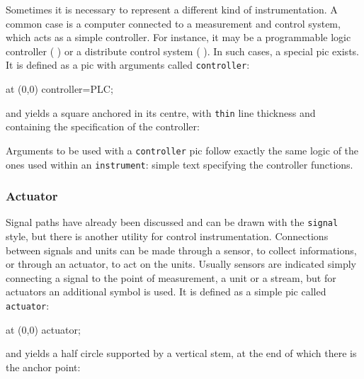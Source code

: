 \documentclass[12pt]{article}						%
\newcommand*{\ac}[1]{%
		\textsmaller{#1}%
	}
\newcommand*{\chpn}[1]{\texttt{#1}}				%
\newcommand*{\chpp}[1]{\texttt{#1}}				%
\newcommand*{\chps}[1]{\texttt{#1}}				%
\begin{document}
Sometimes it is necessary to represent a different kind of instrumentation. A
common case is a computer connected to a measurement and control system, which
acts as a simple controller. For instance, it may be a programmable logic
controller (\ac{PLC}) or a distribute control system (\ac{DCS}). In such cases, a
special pic exists. It is defined as a pic with arguments called
\chpp{controller}:
\begin{chpcode}
	\pic at (0,0) {controller=PLC};
\end{chpcode}
and yields a square anchored in its centre, with \verb|thin| line thickness and
containing the specification of the controller:
\begin{center}
\end{center}

Arguments to be used with a \chpp{controller} pic follow exactly the same
logic of the ones used within an \chpp{instrument}: simple text specifying the
controller functions.

\subsubsection{Actuator}

Signal paths have already been discussed and can be drawn with the \chps{signal}
style, but there is another utility for control instrumentation. Connections
between signals and units can be made through a sensor, to collect informations,
or through an actuator, to act on the units. Usually sensors are indicated
simply connecting a signal to the point of measurement, a unit or a stream, but
for actuators an additional symbol is used. It is defined as a simple pic called
\chpp{actuator}:
\begin{chpcode}
	\pic at (0,0) {actuator};
\end{chpcode}
and yields a half circle supported by a vertical stem, at the end of which
there is the anchor point:
\begin{center}
\end{center}
\end{document}

